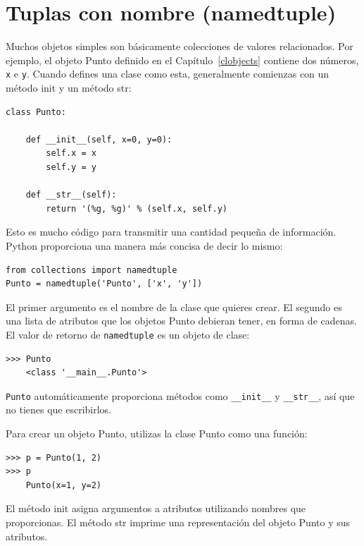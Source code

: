 \documentclass[10pt]{book}
\begin{document}
\section{Tuplas con nombre (namedtuple)}

Muchos objetos simples son básicamente colecciones de valores relacionados.
Por ejemplo, el objeto Punto definido en el Capítulo~\ref{clobjects} contiene
dos números, {\tt x} e {\tt y}.  Cuando defines una clase como
esta, generalmente comienzas con un método init y un método str:

\begin{verbatim}
class Punto:

    def __init__(self, x=0, y=0):
        self.x = x
        self.y = y

    def __str__(self):
        return '(%g, %g)' % (self.x, self.y)
\end{verbatim}

Esto es mucho código para transmitir una cantidad pequeña de información.
Python proporciona una manera más concisa de decir lo mismo:

\begin{verbatim}
from collections import namedtuple
Punto = namedtuple('Punto', ['x', 'y'])
\end{verbatim}

El primer argumento es el nombre de la clase que quieres crear.
El segundo es una lista de atributos que los objetos Punto debieran tener,
en forma de cadenas.  El valor de retorno de {\tt namedtuple} es un objeto de clase:

\begin{verbatim}
>>> Punto
    <class '__main__.Punto'>
\end{verbatim}

{\tt Punto} automáticamente proporciona métodos como \verb"__init__" y
\verb"__str__", así que no tienes que escribirlos.

Para crear un objeto Punto, utilizas la clase Punto como una función:

\begin{verbatim}
>>> p = Punto(1, 2)
>>> p
    Punto(x=1, y=2)
\end{verbatim}

El método init asigna argumentos a atributos utilizando nombres
que proporcionas.  El método str imprime una representación del objeto Punto
y sus atributos.
\end{document}
